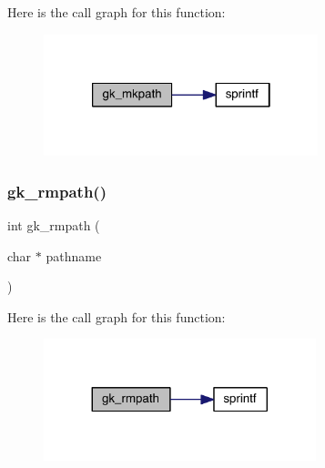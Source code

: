Here is the call graph for this function\+:\nopagebreak
\begin{figure}[H]
\begin{center}
\leavevmode
\includegraphics[width=226pt]{a00035_ab7c5c98647a9e3366fbe03a3a12f1f80_cgraph}
\end{center}
\end{figure}
\mbox{\label{a00035_a8859354bba4be7b1eb2a3846684fd1f9}} 
\subsubsection{\texorpdfstring{gk\+\_\+rmpath()}{gk\_rmpath()}}
{\footnotesize\ttfamily int gk\+\_\+rmpath (\begin{DoxyParamCaption}\item[{char $\ast$}]{pathname }\end{DoxyParamCaption})}

Here is the call graph for this function\+:\nopagebreak
\begin{figure}[H]
\begin{center}
\leavevmode
\includegraphics[width=224pt]{a00035_a8859354bba4be7b1eb2a3846684fd1f9_cgraph}
\end{center}
\end{figure}
